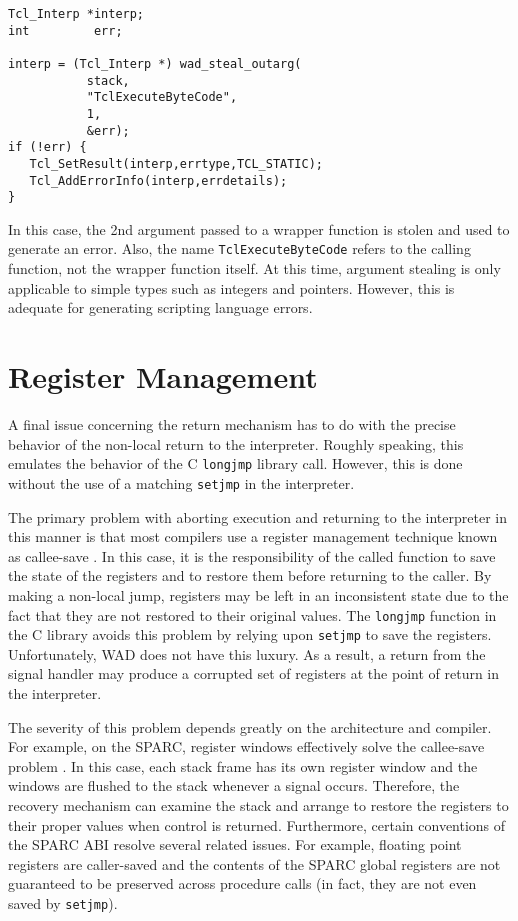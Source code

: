 \begin{verbatim}
Tcl_Interp *interp;
int         err;

interp = (Tcl_Interp *) wad_steal_outarg(
           stack,                
           "TclExecuteByteCode",
           1,
           &err);
if (!err) {
   Tcl_SetResult(interp,errtype,TCL_STATIC);
   Tcl_AddErrorInfo(interp,errdetails);
}
\end{verbatim}

In this case, the 2nd argument passed to a wrapper function 
is stolen and used to generate an error.  Also, the name {\tt TclExecuteByteCode}
refers to the calling function, not the wrapper function itself.
At this time, argument stealing is only applicable to simple types
such as integers and pointers.  However, this is adequate for generating
scripting language errors.

\section{Register Management}

A final issue concerning the return mechanism has to do with the
precise behavior of the non-local return to the interpreter.  Roughly
speaking, this emulates the behavior of the C {\tt longjmp}
library call.  However, this is done without the use of a matching
{\tt setjmp} in the interpreter.  

The primary problem with aborting execution and returning to the
interpreter in this manner is that most compilers use a register management technique
known as callee-save \cite{prag}.  In this case, it is the responsibility of
the called function to save the state of the registers and to restore
them before returning to the caller. By making a non-local jump,
registers may be left in an inconsistent state due to the fact that
they are not restored to their original values.  The {\tt longjmp} function
in the C library avoids this problem by relying upon {\tt setjmp} to save
the registers.  Unfortunately, WAD does not have this
luxury.  As a result, a return from the signal handler may produce a 
corrupted set of registers at the point of return in the interpreter.

The severity of this problem depends greatly on the architecture and
compiler.  For example, on the SPARC, register windows effectively
solve the callee-save problem \cite{sparc}.  In this case, each stack frame has its own
register window and the windows are flushed to the stack whenever a
signal occurs.  Therefore, the recovery mechanism can examine the stack and
arrange to restore the registers to their proper values when control
is returned.  Furthermore, certain conventions of the SPARC ABI resolve several related
issues. For example, floating point registers are caller-saved
and the contents of the SPARC global registers are not guaranteed to be preserved
across procedure calls (in fact, they are not even saved by {\tt setjmp}).

